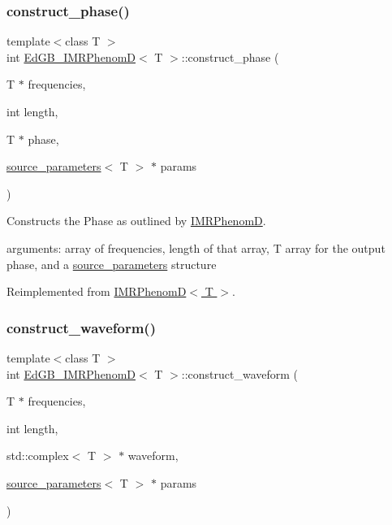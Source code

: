 \subsubsection{\texorpdfstring{construct\+\_\+phase()}{construct\_phase()}}
{\footnotesize\ttfamily template$<$class T $>$ \\
int \hyperlink{classEdGB__IMRPhenomD}{Ed\+G\+B\+\_\+\+I\+M\+R\+PhenomD}$<$ T $>$\+::construct\+\_\+phase (\begin{DoxyParamCaption}\item[{T $\ast$}]{frequencies,  }\item[{int}]{length,  }\item[{T $\ast$}]{phase,  }\item[{\hyperlink{structsource__parameters}{source\+\_\+parameters}$<$ T $>$ $\ast$}]{params }\end{DoxyParamCaption})\hspace{0.3cm}{\ttfamily [virtual]}}



Constructs the Phase as outlined by \hyperlink{classIMRPhenomD}{I\+M\+R\+PhenomD}. 

arguments\+: array of frequencies, length of that array, T array for the output phase, and a \hyperlink{structsource__parameters}{source\+\_\+parameters} structure 

Reimplemented from \hyperlink{classIMRPhenomD_abcbaafd0dc4086d2abe1f5ce256908c2}{I\+M\+R\+Phenom\+D$<$ T $>$}.

\mbox{\label{classEdGB__IMRPhenomD_a11f86d5239ced2ab1372375cd930f12c}} 
\subsubsection{\texorpdfstring{construct\+\_\+waveform()}{construct\_waveform()}}
{\footnotesize\ttfamily template$<$class T $>$ \\
int \hyperlink{classEdGB__IMRPhenomD}{Ed\+G\+B\+\_\+\+I\+M\+R\+PhenomD}$<$ T $>$\+::construct\+\_\+waveform (\begin{DoxyParamCaption}\item[{T $\ast$}]{frequencies,  }\item[{int}]{length,  }\item[{std\+::complex$<$ T $>$ $\ast$}]{waveform,  }\item[{\hyperlink{structsource__parameters}{source\+\_\+parameters}$<$ T $>$ $\ast$}]{params }\end{DoxyParamCaption})\hspace{0.3cm}{\ttfamily [virtual]}}



